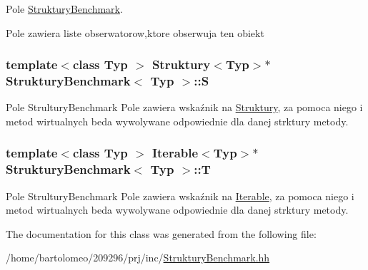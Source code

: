 Pole \hyperlink{class_struktury_benchmark}{Struktury\-Benchmark}. 

Pole zawiera liste obserwatorow,ktore obserwuja ten obiekt \hypertarget{class_struktury_benchmark_aa71bb2ddb1fb6f9e07ef8423c6225464}{
\subsubsection[{S}]{\setlength{\rightskip}{0pt plus 5cm}template$<$class Typ $>$ {\bf Struktury}$<$Typ$>$$\ast$ {\bf Struktury\-Benchmark}$<$ Typ $>$\-::S\hspace{0.3cm}{\ttfamily [private]}}}\label{class_struktury_benchmark_aa71bb2ddb1fb6f9e07ef8423c6225464}


Pole Strultury\-Benchmark Pole zawiera wskaźnik na \hyperlink{class_struktury}{Struktury}, za pomoca niego i metod wirtualnych beda wywolywane odpowiednie dla danej strktury metody. 

\hypertarget{class_struktury_benchmark_a1b7a323989d91e35099941977b688b22}{
\subsubsection[{T}]{\setlength{\rightskip}{0pt plus 5cm}template$<$class Typ $>$ {\bf Iterable}$<$Typ$>$$\ast$ {\bf Struktury\-Benchmark}$<$ Typ $>$\-::T\hspace{0.3cm}{\ttfamily [private]}}}\label{class_struktury_benchmark_a1b7a323989d91e35099941977b688b22}


Pole Strultury\-Benchmark Pole zawiera wskaźnik na \hyperlink{class_iterable}{Iterable}, za pomoca niego i metod wirtualnych beda wywolywane odpowiednie dla danej strktury metody. 



The documentation for this class was generated from the following file\-:\begin{DoxyCompactItemize}
\item 
/home/bartolomeo/209296/prj/inc/\hyperlink{_struktury_benchmark_8hh}{Struktury\-Benchmark.\-hh}\end{DoxyCompactItemize}
